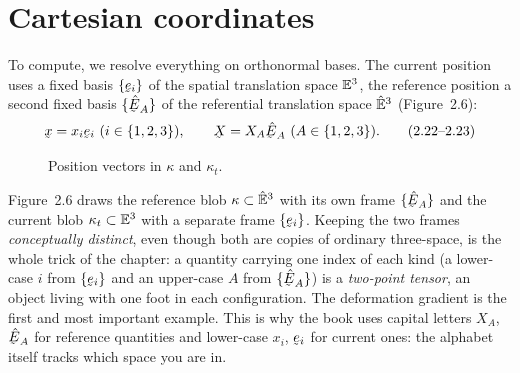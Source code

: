 \section{Cartesian coordinates}\label{sec:cart}

To compute, we resolve everything on orthonormal bases. The current
position uses a fixed basis $\{\be_i\}$ of the spatial translation space
$\mathbb{E}^{3}$, the reference position a second fixed basis $\{\hbE_A\}$ of the
referential translation space $\hat{\mathbb{E}}^{3}$ (Figure~2.6):
\begin{equation}
   \bx=x_i\be_i\ (i\in\{1,2,3\}),\qquad
   \bX=X_A\hbE_A\ (A\in\{1,2,3\}). \tag{2.22--2.23}\label{eq:2.22}
\end{equation}

\begin{figure}[htbp]\centering
{}
\caption{Position vectors in $\kappa$ and $\kappa_t$.}\label{fig:2.6}
\end{figure}

\begin{remark}\label{rem:fig6}
Figure~2.6 draws the reference blob $\kappa\subset\hat{\mathbb{E}}^{3}$ with its own frame
$\{\hbE_A\}$ and the current blob $\kappa_t\subset\mathbb{E}^{3}$ with a separate frame
$\{\be_i\}$. Keeping the two frames \emph{conceptually distinct}, even
though both are copies of ordinary three-space, is the whole trick of the
chapter: a quantity carrying one index of each kind (a lower-case $i$ from
$\{\be_i\}$ and an upper-case $A$ from $\{\hbE_A\}$) is a \emph{two-point
tensor}, an object living with one foot in each configuration. The
deformation gradient is the first and most important example. This is why
the book uses capital letters $X_A$, $\hbE_A$ for reference quantities and
lower-case $x_i$, $\be_i$ for current ones: the alphabet itself tracks which
space you are in.
\end{remark}

